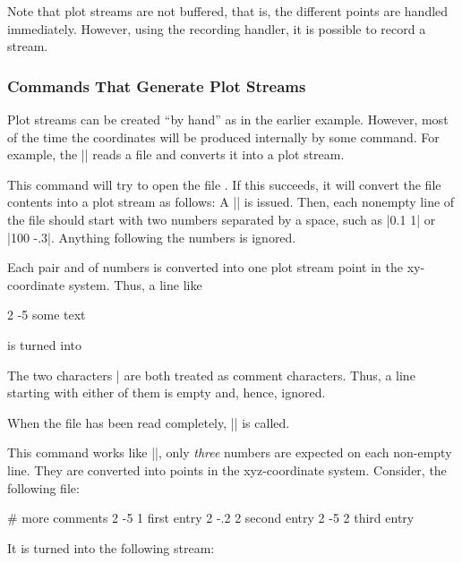 Note that plot streams are not buffered, that is, the different points
are handled immediately. However, using the recording handler, it is
possible to record a stream.

\subsubsection{Commands That Generate Plot Streams}

Plot streams can be created ``by hand'' as in the earlier
example. However, most of the time the coordinates will be produced
internally by some command. For example, the |\pgfplotxyfile| reads a
file and converts it into a plot stream.

\begin{command}{\pgfplotxyfile{}}
  This command will try to open the file . If this
  succeeds, it will convert the file contents into a plot stream as
  follows: A |\pgfplotstreamstart| is issued. Then, each nonempty line
  of the file should start with two numbers separated by a space, such
  as |0.1 1| or |100 -.3|. Anything following the numbers is ignored.

  Each pair  and  of numbers is converted into one
  plot stream point in the xy-coordinate system. Thus, a line like
\begin{codeexample}
2 -5 some text
\end{codeexample}
  is turned into
\begin{codeexample}
\end{codeexample}

  The two characters |%
  are both treated as comment characters. Thus, a line starting with
  either of them is empty and, hence, ignored.

  When the file has been read completely, |\pgfplotstreamend| is
  called.
\end{command}


\begin{command}{\pgfplotxyzfile{}}
  This command works like |\pgfplotxyfile|, only \emph{three} numbers
  are expected on each non-empty line. They are converted into points
  in the xyz-coordinate system. Consider, the following file:
\begin{codeexample}
# more comments
2 -5  1 first entry
2 -.2 2 second entry
2 -5  2 third entry
\end{codeexample}
  It is turned into the following stream:
\begin{codeexample}
\pgfplotstreamstart
{}
\pgfplotstreamend
\end{codeexample}
\end{command}


